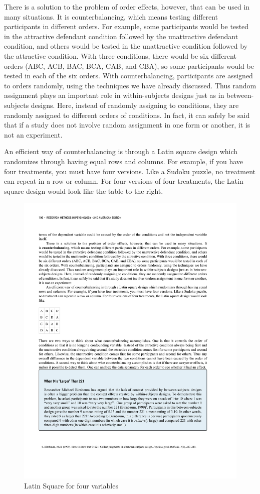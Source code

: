 There is a solution to the problem of order effects, however, that can be used in many situations. It is counterbalancing, which means testing different participants in different orders. For example, some participants would be tested in the attractive defendant condition followed by the unattractive defendant condition, and others would be tested in the unattractive condition followed by the attractive condition. With three conditions, there would be six different orders (ABC, ACB, BAC, BCA, CAB, and CBA), so some participants would be tested in each of the six orders. With counterbalancing, participants are assigned to orders randomly, using the techniques we have already discussed. Thus random assignment plays an important role in within-subjects designs just as in between- subjects designs. Here, instead of randomly assigning to conditions, they are randomly assigned to different orders of conditions. In fact, it can safely be said that if a study does not involve random assignment in one form or another, it is not an experiment.

An efficient way of counterbalancing is through a Latin square design which randomizes through having equal rows and columns. For example, if you have four treatments, you must have four versions. Like a Sudoku puzzle, no treatment can repeat in a row or column. For four versions of four treatments, the Latin square design would look like the table to the right.

\begin{figure}[0in]
\includegraphics[width=\linewidth]{figures/C6counterbalance.pdf}
\caption{Latin Square for four variables}
\label{fig:latin}
\end{figure}

